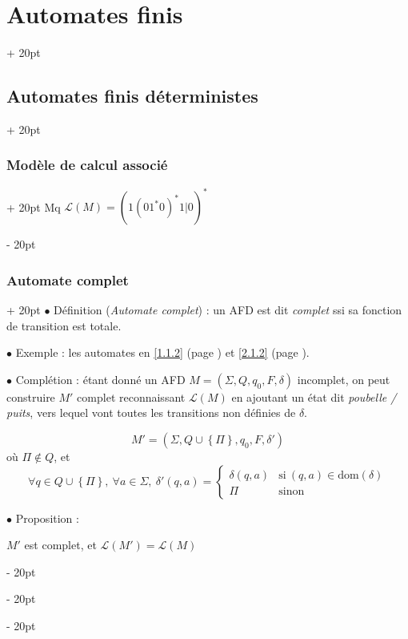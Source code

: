 \documentclass[a4paper, 12pt, twoside]{article}
\newcommand{\set}[1]{\left\{ #1 \right\}}
\newcommand{\ind}[1][20pt]{\advance\leftskip + #1}
\newcommand{\deind}[1][20pt]{\advance\leftskip - #1}
\newenvironment{indt}[2][20pt]{#2 \par \ind[#1]}{\par \deind} %
\begin{document}
\begin{indt}{\section{Automates finis}}
\begin{indt}{\subsection{Automates finis déterministes}}
\begin{indt}{\subsubsection{Modèle de calcul associé}}
                 Mq $\mathcal L(M) = (1(01^*0)^*1|0)^*$
            \end{indt}

            \vspace{12pt}
            
            \begin{indt}{\subsubsection{Automate complet}}
                $\bullet$ Définition (\emph{Automate complet}) : un AFD est dit \emph{complet} ssi sa fonction de transition est totale.

                \vspace{12pt}
                
                $\bullet$ Exemple : les automates en \ref{1.1.2} (page \pageref{1.1.2}) et \ref{2.1.2} (page \pageref{2.1.2}).

                \vspace{12pt}
                
                $\bullet$ Complétion : étant donné un AFD $M = (\Sigma, Q, q_0, F, \delta)$ incomplet, on peut construire $M'$ complet reconnaissant $\mathcal L(M)$ en ajoutant un état dit \emph{poubelle / puits}, vers lequel vont toutes les transitions non définies de $\delta$.

                \[
                    M' = (\Sigma, Q \cup \set \Pi, q_0, F, \delta')
                \]
                où $\Pi \notin Q$, et
                \[
                    \forall q \in Q \cup \set \Pi,\ \forall a \in \Sigma,\
                    \delta'(q, a) =
                    \begin{cases}
                        \delta(q, a)
                        & \text{si}\ (q, a) \in \mathrm{dom}(\delta)
                        \\
                        \Pi
                        & \text{sinon}
                    \end{cases}
                \]

                \vspace{12pt}
                
                $\bullet$ Proposition :
                \begin{emphBox}
                    $M'$ est complet, et $\mathcal L(M') = \mathcal L(M)$
                \end{emphBox}


\end{indt}
\end{indt}
\end{indt}
\end{document}
